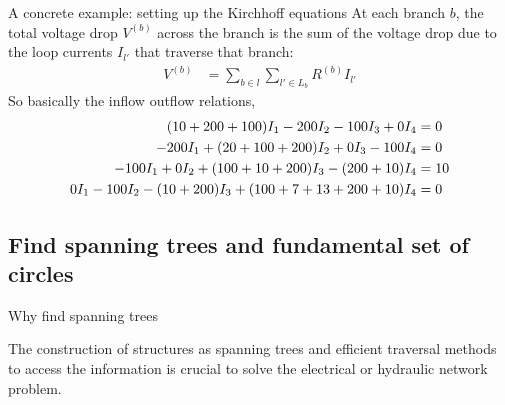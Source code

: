 \documentclass[xcolor=dvipsnames]{beamer}
\begin{document}
\begin{frame}{A concrete example: setting up the Kirchhoff equations}
At each branch $b$, the total voltage drop $V^{(b)}$ across the branch is the sum of the voltage drop due to the loop currents $I_{l'}$ that traverse that branch:
\begin{align*}
	V^{(b)} &= \sum_{b\in l}\sum_{l'\in L_b} R^{(b)}I_{l'}
\end{align*}
So basically the inflow outflow relations,
\begin{align}\label{eq1}
	(10 + 200 + 100)I_1 - 200 I_2 - 100 I_3 + 0 I_4 &= 0\\
	-200 I_1 + (20 + 100 + 200) I_2 + 0 I_3 - 100 I_4 &= 0\notag\\
	-100 I_1 + 0 I_2 + (100 + 10 + 200)I_3 - (200+10)I_4 &=10\notag\\
	0 I_1 - 100 I_2 - (10+200) I_3 + (100 + 7 + 13 + 200 + 10) I_4 &= 0\notag
\end{align}
\end{frame}

\subsection{Find spanning trees and fundamental set of circles}

\begin{frame}{Why find spanning trees}

The construction of structures as spanning trees and efficient
traversal methods to access the information is crucial to solve the electrical or hydraulic network problem.
	
\end{frame}
\end{document}
